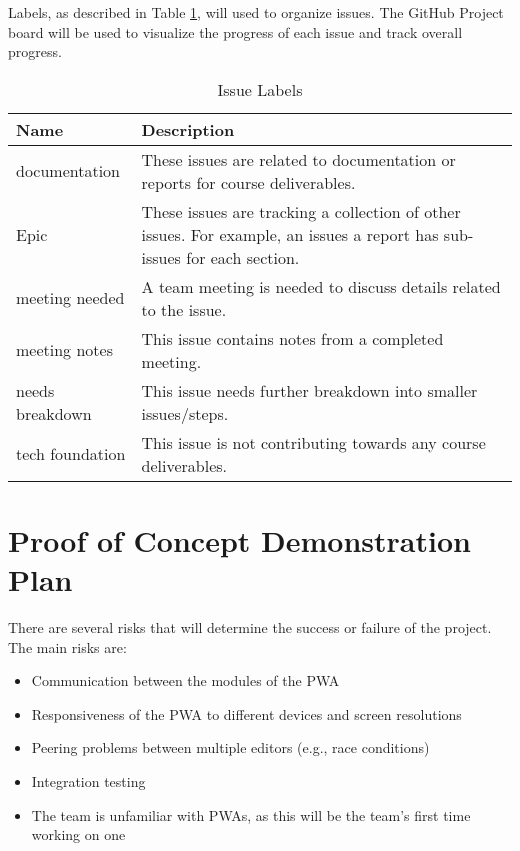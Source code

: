 \documentclass{article}
\begin{document}
Labels, as described in Table \ref{issueLabels}, will used to organize issues. The GitHub Project
board will be used to visualize the progress of each issue and track overall progress.

\begin{table}[H]
  \centering
  \caption{Issue Labels}
  \vspace{5pt}
  \begin{tabular}{|p{}|p{}|}
      \hline
      \textbf{Name} & \textbf{Description}\\
      \hline
      documentation & These issues are related to documentation or reports for course deliverables.\\
      \hline
      Epic & These issues are tracking a collection of other issues. For example, an issues a report
      has sub-issues for each section.\\
      \hline
      meeting needed & A team meeting is needed to discuss details related to the issue.\\
      \hline
      meeting notes & This issue contains notes from a completed meeting.\\
      \hline
      needs breakdown & This issue needs further breakdown into smaller issues/steps.\\
      \hline
      tech foundation & This issue is not contributing towards any course deliverables.\\
      \hline
  \end{tabular}

  \label{issueLabels}
\end{table}


\section{Proof of Concept Demonstration Plan}

There are several risks that will determine the success or failure of the project. The main risks are:

\begin{itemize}
	\item Communication between the modules of the PWA
	\item Responsiveness of the PWA to different devices and screen resolutions
	\item Peering problems between multiple editors (e.g., race conditions)
	\item Integration testing
	\item The team is unfamiliar with PWAs, as this will be the team's first time working on one
\end{itemize}
\end{document}
